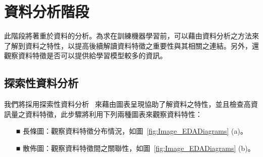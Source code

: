 
\section{資料分析階段}

此階段將著重於資料的分析。為求在訓練機器學習前，可以藉由資料分析之方法來了解到資料之特性，以提高後續解讀資料特徵之重要性與其相關之連結。另外，還觀察資料特徵是否可以提供給學習模型較多的資訊。

\subsection{探索性資料分析}
我們將採用探索性資料分析~\cite{tukey1977exploratory} 來藉由圖表呈現協助了解資料之特性，並且檢查高資訊量之資料特徵，此步驟將利用下列兩種圖表來觀察資料特性：

\begin{itemize}
  \item [■] 長條圖：觀察資料特徵分布情況，如圖~\ref{fig:Image_EDADiagrams} (a)。
  \item [■] 散佈圖：觀察資料特徵間之關聯性，如圖~\ref{fig:Image_EDADiagrams} (b)。
\end{itemize}

